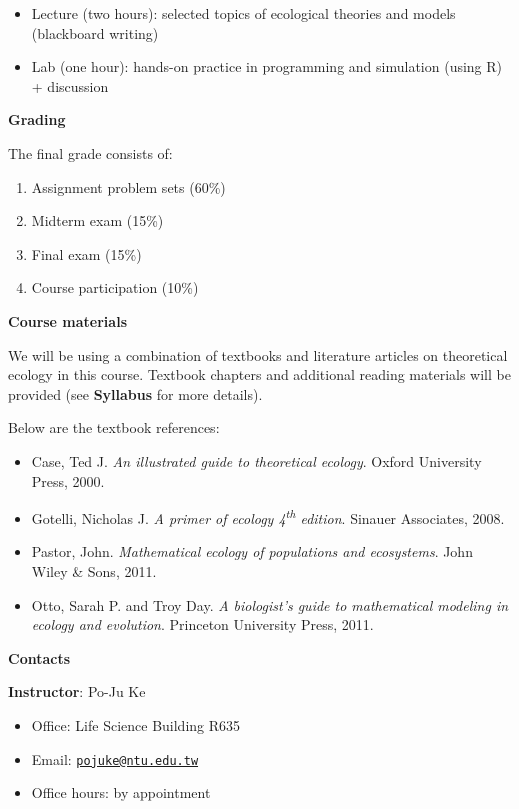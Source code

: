 \documentclass[
]{book}
\providecommand{\tightlist}{%
  \setlength{\itemsep}{0pt}\setlength{\parskip}{0pt}}
\begin{document}
\begin{itemize}
\tightlist
\item
  Lecture (two hours): selected topics of ecological theories and models (blackboard writing)
\item
  Lab (one hour): hands-on practice in programming and simulation (using R) + discussion
\end{itemize}

\textbf{Grading}

The final grade consists of:

\begin{enumerate}
\def\labelenumi{(\arabic{enumi})}
\tightlist
\item
  Assignment problem sets (60\%)
\item
  Midterm exam (15\%)
\item
  Final exam (15\%)
\item
  Course participation (10\%)
\end{enumerate}

\textbf{Course materials}

We will be using a combination of textbooks and literature articles on theoretical ecology in this course. Textbook chapters and additional reading materials will be provided (see \textbf{Syllabus} for more details).

Below are the textbook references:

\begin{itemize}
\tightlist
\item
  Case, Ted J. \emph{An illustrated guide to theoretical ecology}. Oxford University Press, 2000.
\item
  Gotelli, Nicholas J. \emph{A primer of ecology 4\textsuperscript{th} edition}. Sinauer Associates, 2008.
\item
  Pastor, John. \emph{Mathematical ecology of populations and ecosystems}. John Wiley \& Sons, 2011.
\item
  Otto, Sarah P. and Troy Day. \emph{A biologist's guide to mathematical modeling in ecology and evolution}. Princeton University Press, 2011.
\end{itemize}

\textbf{Contacts}

\textbf{Instructor}: Po-Ju Ke

\begin{itemize}
\tightlist
\item
  Office: Life Science Building R635
\item
  Email: \href{mailto:pojuke@ntu.edu.tw}{\nolinkurl{pojuke@ntu.edu.tw}}
\item
  Office hours: by appointment
\end{itemize}
\end{document}

